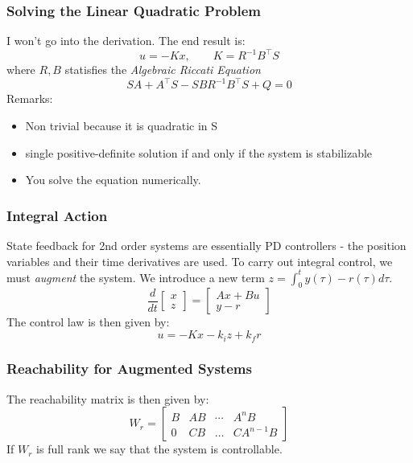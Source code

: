 \documentclass{beamer}
\theoremstyle{remark}
\begin{document}
\begin{frame}
\frametitle{Solving the Linear Quadratic Problem}
I won't go into the derivation. 
The end result is: 
\begin{equation}
    u = -K x, \qquad K = R^{-1} B^{\top} S
\end{equation}
where $R, B$ statisfies the \textsl{Algebraic Riccati Equation}
\begin{equation}
    SA + A^{\top} S - S B R^{-1} B^{\top} S + Q = 0
\end{equation}
Remarks: 
\begin{itemize}
    \item Non trivial because it is quadratic in S
    \item single positive-definite solution if and only if the system is stabilizable
    \item You solve the equation numerically. 
\end{itemize}
\end{frame}

\begin{frame}
\frametitle{Integral Action}
State feedback for 2nd order systems are essentially PD controllers - the position variables and their time derivatives are used. 
\newline
To carry out integral control, we must \textsl{augment} the system. We introduce a new term $z = \int_{0}^{t} y(\tau) - r(\tau) d\tau$.
\begin{equation}
    \frac{d}{dt}
    \begin{bmatrix}
        x \\
        z
    \end{bmatrix}
    = 
    \begin{bmatrix}
        Ax + Bu \\
        y - r
    \end{bmatrix}
\end{equation}
The control law is then given by: 
\begin{equation}
    u = - Kx - k_i z + k_f r
\end{equation}
\end{frame}

\begin{frame}
\frametitle{Reachability for Augmented Systems}
The reachability matrix is then given by: 
\begin{equation}
    W_r = 
    \begin{bmatrix}
        B & AB & \cdots & A^n B \\
        0 & CB & \dots & CA^{n-1}B 
    \end{bmatrix}
\end{equation}
If $W_r$ is full rank we say that the system is controllable.
\end{frame}
\end{document}
